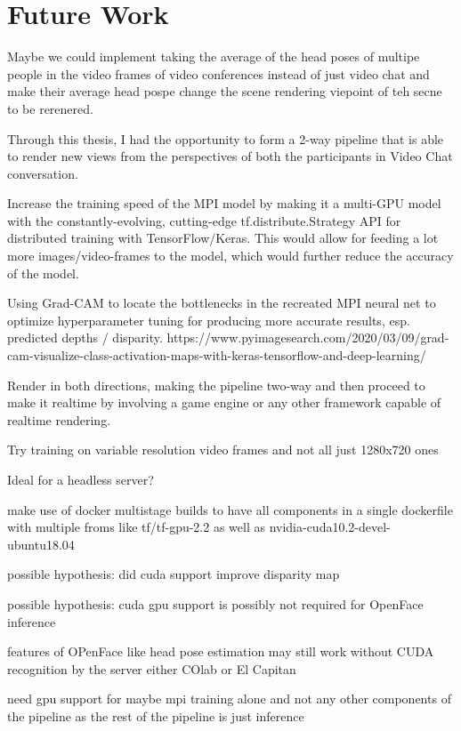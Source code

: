 \section{Future Work}\label{sec1:future-work}
Maybe we could implement taking the average of the head poses of multipe people in the video frames of video conferences instead of just video chat and make their average head pospe change the scene rendering viepoint of teh secne to be rerenered.

Through this thesis, I had the opportunity to form a 2-way pipeline that is able to render new views from the perspectives of both the participants in Video Chat conversation.

Increase the training speed of the MPI model by making it a multi-GPU model with the constantly-evolving, cutting-edge tf.distribute.Strategy API for distributed training with TensorFlow/Keras.
This would allow for feeding a lot more images/video-frames to the model, which would further reduce the accuracy of the model.

Using Grad-CAM to locate the bottlenecks in the recreated MPI neural net to optimize hyperparameter tuning for producing more accurate results, esp. predicted depths / disparity.
https://www.pyimagesearch.com/2020/03/09/grad-cam-visualize-class-activation-maps-with-keras-tensorflow-and-deep-learning/


Render in both directions, making the pipeline two-way and then proceed to make it realtime by involving a game engine or any other framework capable of realtime rendering. 

Try training on variable resolution video frames and not all just 1280x720 ones

Ideal for a headless server?

make use of docker multistage builds to have all components in a single dockerfile
with multiple froms like tf/tf-gpu-2.2 as well as nvidia-cuda10.2-devel-ubuntu18.04

possible hypothesis: did cuda support improve disparity map

possible hypothesis: cuda gpu support is possibly not required for OpenFace inference

features of OPenFace like head pose estimation may still work without CUDA recognition by the server either COlab or El Capitan 

need gpu support for maybe mpi training alone and not any other components of the pipeline as the rest of the pipeline is just inference

